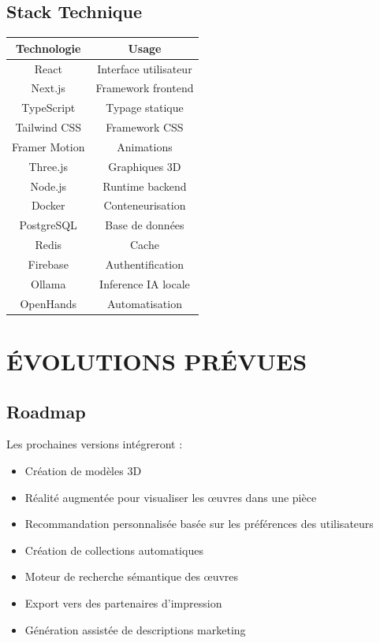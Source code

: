 \documentclass[12pt,a4paper,oneside]{book}
\begin{document}
\section{Stack Technique}
\begin{center}
\begin{tabular}{|c|c|}
\hline
\rowcolor{electronblue}
\color{white}\textbf{Technologie} & \color{white}\textbf{Usage} \\
\hline
React & Interface utilisateur \\
\hline
Next.js & Framework frontend \\
\hline
TypeScript & Typage statique \\
\hline
Tailwind CSS & Framework CSS \\
\hline
Framer Motion & Animations \\
\hline
Three.js & Graphiques 3D \\
\hline
Node.js & Runtime backend \\
\hline
Docker & Conteneurisation \\
\hline
PostgreSQL & Base de données \\
\hline
Redis & Cache \\
\hline
Firebase & Authentification \\
\hline
Ollama & Inference IA locale \\
\hline
OpenHands & Automatisation \\
\hline
\end{tabular}
\end{center}

\chapter{ÉVOLUTIONS PRÉVUES}

\section{Roadmap}
Les prochaines versions intégreront :
\begin{itemize}
\item Création de modèles 3D
\item Réalité augmentée pour visualiser les œuvres dans une pièce
\item Recommandation personnalisée basée sur les préférences des utilisateurs
\item Création de collections automatiques
\item Moteur de recherche sémantique des œuvres
\item Export vers des partenaires d'impression
\item Génération assistée de descriptions marketing
\end{itemize}
\end{document}
